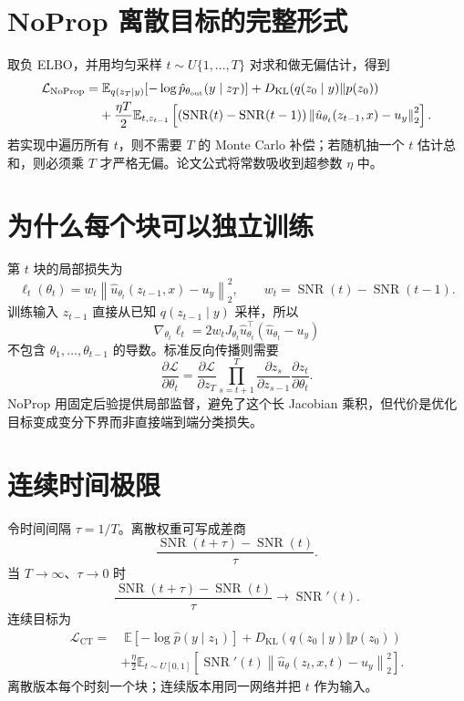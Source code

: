 \documentclass[UTF8,12pt,a4paper,fontset=none]{ctexart}
\numberwithin{equation}{section}
\newcommand{\E}{\mathbb{E}}
\newcommand{\Loss}{\mathcal{L}}
\newcommand{\norm}[1]{\left\lVert #1\right\rVert}
\newcommand{\KL}{D_{\mathrm{KL}}}
\begin{document}
\section{NoProp 离散目标的完整形式}
取负 ELBO，并用均匀采样 $t\sim U\{1,\ldots,T\}$ 对求和做无偏估计，得到
\begin{align}
 \Loss_{\mathrm{NoProp}}
 =&\;\E_{q(z_T\mid y)}[-\log \hat p_{\theta_{\rm out}}(y\mid z_T)]
 +\KL(q(z_0\mid y)\Vert p(z_0))\\
 &+\frac{\eta T}{2}\E_{t,z_{t-1}}
 \left[(\operatorname{SNR}(t)-\operatorname{SNR}(t-1))
 \norm{\hat u_{\theta_t}(z_{t-1},x)-u_y}_2^2\right].
\end{align}
若实现中遍历所有 $t$，则不需要 $T$ 的 Monte Carlo 补偿；若随机抽一个 $t$ 估计总和，则必须乘 $T$ 才严格无偏。论文公式将常数吸收到超参数 $\eta$ 中。

\section{为什么每个块可以独立训练}
第 $t$ 块的局部损失为
\begin{equation}
 \ell_t(\theta_t)=w_t\norm{\hat u_{\theta_t}(z_{t-1},x)-u_y}_2^2,
 \qquad w_t=\operatorname{SNR}(t)-\operatorname{SNR}(t-1).
\end{equation}
训练输入 $z_{t-1}$ 直接从已知 $q(z_{t-1}\mid y)$ 采样，所以
\begin{equation}
 \nabla_{\theta_t}\ell_t
 =2w_tJ_{\theta_t}\hat u_{\theta_t}^{\top}(\hat u_{\theta_t}-u_y)
\end{equation}
不包含 $\theta_1,\ldots,\theta_{t-1}$ 的导数。标准反向传播则需要
\begin{equation}
 \frac{\partial\Loss}{\partial\theta_t}
 =\frac{\partial\Loss}{\partial z_T}
 \prod_{s=t+1}^{T}\frac{\partial z_s}{\partial z_{s-1}}
 \frac{\partial z_t}{\partial\theta_t}.
\end{equation}
NoProp 用固定后验提供局部监督，避免了这个长 Jacobian 乘积，但代价是优化目标变成变分下界而非直接端到端分类损失。

\section{连续时间极限}
令时间间隔 $\tau=1/T$。离散权重可写成差商
\begin{equation}
 \frac{\operatorname{SNR}(t+\tau)-\operatorname{SNR}(t)}{\tau}.
\end{equation}
当 $T\to\infty$、$\tau\to0$ 时
\begin{equation}
 \frac{\operatorname{SNR}(t+\tau)-\operatorname{SNR}(t)}{\tau}
 \to \operatorname{SNR}'(t).
\end{equation}
连续目标为
\begin{align}
 \Loss_{\mathrm{CT}}
 =&\;\E[-\log\hat p(y\mid z_1)]
 +\KL(q(z_0\mid y)\Vert p(z_0))\\
 &+\frac{\eta}{2}\E_{t\sim U[0,1]}
 \left[\operatorname{SNR}'(t)
 \norm{\hat u_\theta(z_t,x,t)-u_y}_2^2\right].
\end{align}
离散版本每个时刻一个块；连续版本用同一网络并把 $t$ 作为输入。
\end{document}
